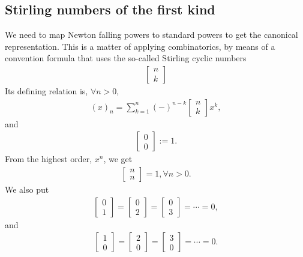 \documentclass[11pt]{book}
\begin{document}
\subsection{Stirling numbers of the first kind}
We need to map Newton falling powers to standard powers to get the canonical representation.  
This is a matter of applying combinatorics, by means of a convention formula that uses the so-called Stirling cyclic numbers 
\begin{eqnarray}
\left[\begin{array}{c}n \\k \end{array}\right]
\end{eqnarray}
Its defining relation is, $\forall n > 0$,
\begin{eqnarray}
(x)_n = \sum_{k=1}^n (-)^{n-k} \left[\begin{array}{c}n \\k \end{array}\right] x^k, 
\end{eqnarray}
and
\begin{eqnarray}
\left[\begin{array}{c}0 \\0 \end{array}\right] := 1.
\end{eqnarray}
From the highest order, $x^n$, we get
\begin{eqnarray}
\left[\begin{array}{c}n \\n \end{array}\right] = 1, \forall n > 0.
\end{eqnarray}
We also put
\begin{eqnarray}
\left[\begin{array}{c}0 \\1 \end{array}\right] = \left[\begin{array}{c}0 \\2 \end{array}\right] = \left[\begin{array}{c}0 \\3 \end{array}\right] = \cdots = 0,
\end{eqnarray}
and
\begin{eqnarray}
\left[\begin{array}{c}1 \\ 0 \end{array}\right] = \left[\begin{array}{c}2  \\ 0 \end{array}\right] =\left[\begin{array}{c}3 \\ 0 \end{array}\right] = \cdots = 0.
\end{eqnarray}
\end{document}
